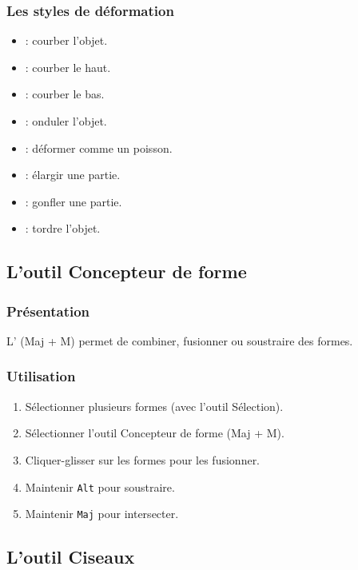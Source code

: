 \subsubsection{Les styles de déformation}

\begin{itemize}
    \item {} : courber l'objet.
    \item {} : courber le haut.
    \item {} : courber le bas.
    \item {} : onduler l'objet.
    \item {} : déformer comme un poisson.
    \item {} : élargir une partie.
    \item {} : gonfler une partie.
    \item {} : tordre l'objet.
\end{itemize}

\subsection{L'outil Concepteur de forme}

\subsubsection{Présentation}

L' (Maj + M) permet de combiner, fusionner ou soustraire des formes.

\subsubsection{Utilisation}

\begin{enumerate}
    \item Sélectionner plusieurs formes (avec l'outil Sélection).
    \item Sélectionner l'outil Concepteur de forme (Maj + M).
    \item Cliquer-glisser sur les formes pour les fusionner.
    \item Maintenir \texttt{Alt} pour soustraire.
    \item Maintenir \texttt{Maj} pour intersecter.
\end{enumerate}

\subsection{L'outil Ciseaux}

